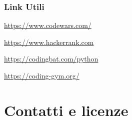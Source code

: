 \documentclass{beamer}
\begin{document}
\begin{frame}

    \frametitle{Link Utili}
    
    \href{https://www.codewars.com/}{https://www.codewars.com/}

    \href{https://www.hackerrank.com}{https://www.hackerrank.com}

    \href{https://codingbat.com/python}{https://codingbat.com/python}

    \href{https://coding-gym.org/}{https://coding-gym.org/}
    
\end{frame}


\section{Contatti e licenze}
\end{document}
